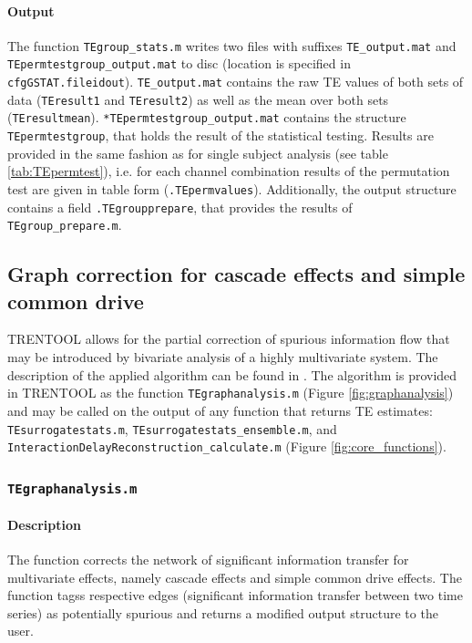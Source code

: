 \documentclass[a4paper,10pt]{article}
\begin{document}
\paragraph*{Output} The function \texttt{TEgroup\_stats.m} writes two files with suffixes \texttt{TE\_output.mat} and \texttt{TEpermtestgroup\_output.mat} to disc (location is specified in \texttt{cfgGSTAT.fileidout}). \texttt{TE\_output.mat} contains the raw TE values of both sets of data (\texttt{TEresult1} and \texttt{TEresult2}) as well as the mean over both sets (\texttt{TEresultmean}). \texttt{*TEpermtestgroup\_output.mat} contains the structure \texttt{TEpermtestgroup}, that holds the result of the statistical testing. Results are provided in the same fashion as for single subject analysis (see table \ref{tab:TEpermtest}), i.e. for each channel combination results of the permutation test are given in table form (\texttt{.TEpermvalues}). Additionally, the output structure contains a field \texttt{.TEgroupprepare}, that provides the results of \texttt{TEgroup\_prepare.m}.


\subsection{Graph correction for cascade effects and simple common drive} \label{sec:graphanalysis}

TRENTOOL allows for the partial correction of spurious information flow that may be introduced by bivariate analysis of a highly multivariate system. The description of the applied algorithm can be found in \cite{wollstadt2013}. The algorithm is provided in TRENTOOL as the function \verb&TEgraphanalysis.m& (Figure \ref{fig:graphanalysis}) and may be called on the output of any function that returns TE estimates: \verb&TEsurrogatestats.m&, \verb&TEsurrogatestats_ensemble.m&, and \verb&InteractionDelayReconstruction_calculate.m& (Figure \ref{fig:core_functions}). 


\subsubsection*{\texttt{TEgraphanalysis.m}}

\paragraph*{Description} The function corrects the network of significant information transfer for multivariate effects, namely cascade effects and simple common drive effects. The function tagss respective edges (significant information transfer between two time series) as potentially spurious and returns a modified output structure to the user.
\end{document}
